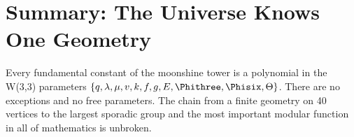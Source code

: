 \section{Summary: The Universe Knows One Geometry}

Every fundamental constant of the moonshine tower is a polynomial
in the W(3,3) parameters $\{q, \lambda, \mu, v, k, f, g, E,
\Phithree, \Phisix, \Theta\}$. There are no exceptions and no
free parameters. The chain from a finite geometry on 40 vertices
to the largest sporadic group and the most important modular
function in all of mathematics is unbroken.
